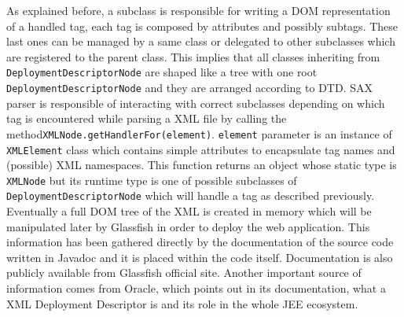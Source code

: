 As explained before, a subclass is responsible for writing a DOM representation of a handled tag, each tag is composed by attributes and possibly subtags. These last ones can be managed by a same class or delegated to other subclasses which are registered to the parent class. \newline This implies that all classes inheriting from \texttt{DeploymentDescriptorNode} are shaped like a tree with one root \texttt{DeploymentDescriptorNode} and they are arranged according to DTD. \newline SAX parser is responsible of interacting with correct subclasses depending on which tag is encountered while parsing a XML file by calling the method\newline\texttt{XMLNode.getHandlerFor(element)}. \texttt{element} parameter is an instance of \texttt{XMLElement} class which contains simple attributes to encapsulate tag names and (possible) XML namespaces. This function returns an object whose static type is \texttt{XMLNode} but its runtime type is one of possible subclasses of \newline \texttt{DeploymentDescriptorNode} which will handle a tag as described previously. \newline
Eventually a full DOM tree of the XML is created in memory which will be manipulated later by Glassfish in order to deploy the web application. \newline
This information has been gathered directly by the documentation of the source code written in Javadoc and it is placed within the code itself. Documentation is also publicly available from Glassfish official site. Another important source of information comes from Oracle, which points out in its documentation, what a XML Deployment Descriptor is and its role in the whole JEE ecosystem.